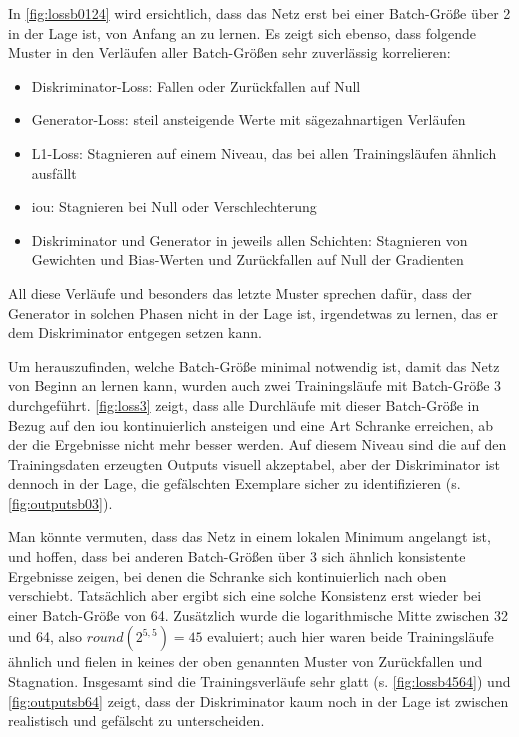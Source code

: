 In \autoref{fig:lossb0124} wird ersichtlich, dass das Netz erst bei einer Batch-Größe über 2 in der Lage ist, von Anfang an zu lernen.
Es zeigt sich ebenso, dass folgende Muster in den Verläufen aller Batch-Größen sehr zuverlässig korrelieren:

\begin{itemize}
	\item Diskriminator-Loss: Fallen oder Zurückfallen auf Null 
	\item Generator-Loss: steil ansteigende Werte mit sägezahnartigen Verläufen
	\item L1-Loss: Stagnieren auf einem Niveau, das bei allen Trainingsläufen ähnlich ausfällt
	\item \gls{iou}: Stagnieren bei Null oder Verschlechterung
	\item Diskriminator und Generator in jeweils allen Schichten: Stagnieren von Gewichten und Bias-Werten und Zurückfallen auf Null der Gradienten
\end{itemize}

All diese Verläufe und besonders das letzte Muster sprechen dafür, dass der Generator in solchen Phasen nicht in der Lage ist, irgendetwas zu lernen, das er dem Diskriminator entgegen setzen kann.


Um herauszufinden, welche Batch-Größe minimal notwendig ist, damit das Netz von Beginn an lernen kann, wurden auch zwei Trainingsläufe mit Batch-Größe 3 durchgeführt.
\autoref{fig:loss3} zeigt, dass alle Durchläufe mit dieser Batch-Größe in Bezug auf den \gls{iou} kontinuierlich ansteigen und eine Art Schranke erreichen, ab der die Ergebnisse nicht mehr besser werden.
Auf diesem Niveau sind die auf den Trainingsdaten erzeugten Outputs visuell akzeptabel, aber der Diskriminator ist dennoch in der Lage, die gefälschten Exemplare sicher zu identifizieren (s. \autoref{fig:outputsb03}).



Man könnte vermuten, dass das Netz in einem lokalen Minimum angelangt ist, und hoffen, dass bei anderen Batch-Größen über 3 sich ähnlich konsistente Ergebnisse zeigen, bei denen die Schranke sich kontinuierlich nach oben verschiebt.
Tatsächlich aber ergibt sich eine solche Konsistenz erst wieder bei einer Batch-Größe von 64.
Zusätzlich wurde die logarithmische Mitte zwischen 32 und 64, also $ round(2^{5,5}) = 45 $ evaluiert; auch hier waren beide Trainingsläufe ähnlich und fielen in keines der oben genannten Muster von Zurückfallen und Stagnation.
Insgesamt sind die Trainingsverläufe sehr glatt (s. \autoref{fig:lossb4564}) und \autoref{fig:outputsb64} zeigt, dass der Diskriminator kaum noch in der Lage ist zwischen realistisch und gefälscht zu unterscheiden.

